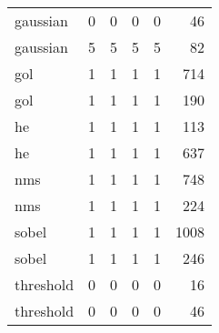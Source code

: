 \begin{tabular}{lrrrrr}
  gaussian & 0 & 0 & 0 & 0 & 46 \\
  gaussian & 5 & 5 & 5 & 5 & 82 \\
  gol & 1 & 1 & 1 & 1 & 714 \\
  gol & 1 & 1 & 1 & 1 & 190 \\
  he & 1 & 1 & 1 & 1 & 113 \\
  he & 1 & 1 & 1 & 1 & 637 \\
  nms & 1 & 1 & 1 & 1 & 748 \\
  nms & 1 & 1 & 1 & 1 & 224 \\
  sobel & 1 & 1 & 1 & 1 & 1008 \\
  sobel & 1 & 1 & 1 & 1 & 246 \\
  threshold & 0 & 0 & 0 & 0 & 16 \\
  threshold & 0 & 0 & 0 & 0 & 46 \\
  \bottomrule
\end{tabular}

